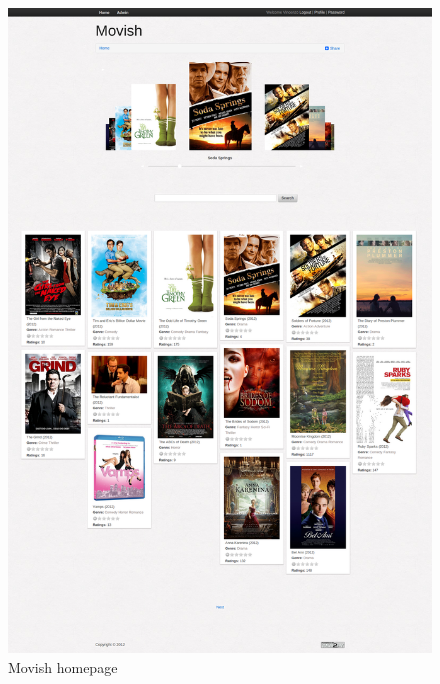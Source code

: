 \begin{figure}
  \centering
  \includegraphics[width=\textwidth]{figures/movish-homepage.png}
  \caption{Movish homepage}
  \label{fig:movish_homepage}
\end{figure}

\acresetall